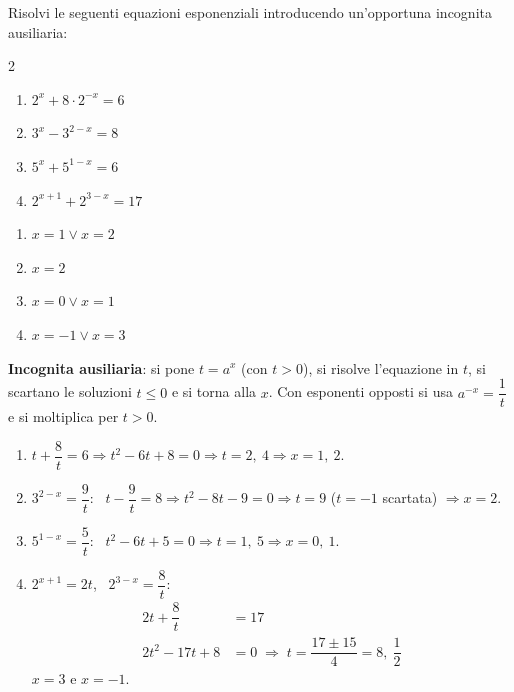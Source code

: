 
\begin{question}[ID=3.9, subtitle={Equazioni con sostituzione: esponenti opposti}, difficulty=media, tags={equazioni, esponenziali, sostituzione}]
Risolvi le seguenti equazioni esponenziali introducendo un'opportuna incognita ausiliaria:
\begin{center}\begin{minipage}{0.92\linewidth}
\begin{multicols}{2}
\begin{enumerate}[leftmargin=3.2cm]
\item $2^{x} + 8 \cdot 2^{-x} = 6$
\item $3^{x} - 3^{2-x} = 8$
\item $5^{x} + 5^{1-x} = 6$
\item $2^{x+1} + 2^{3-x} = 17$
\end{enumerate}
\end{multicols}
\end{minipage}\end{center}
\begin{solution}
\begin{enumerate}
    \item $x=1\vee x=2$
    \item $x=2$
    \item $x=0\vee x=1$
    \item $x=-1\vee x=3$
\end{enumerate}
\end{solution}
\begin{explanation}
\textbf{Incognita ausiliaria}: si pone $t=a^x$ (con $t>0$), si risolve l'equazione in $t$, si scartano le soluzioni $t\leq0$ e si torna alla $x$.
Con esponenti opposti si usa $a^{-x}=\dfrac1t$ e si moltiplica per $t>0$.
\begin{enumerate}
    \item $t+\dfrac8t=6 \Rightarrow t^2-6t+8=0 \Rightarrow t=2,\ 4 \Rightarrow x=1,\ 2$.
    \item $3^{2-x}=\dfrac9t$: \ $t-\dfrac9t=8 \Rightarrow t^2-8t-9=0 \Rightarrow t=9$ ($t=-1$ scartata) $\Rightarrow x=2$.
    \item $5^{1-x}=\dfrac5t$: \ $t^2-6t+5=0 \Rightarrow t=1,\ 5 \Rightarrow x=0,\ 1$.
    \item $2^{x+1}=2t$, \ $2^{3-x}=\dfrac8t$:
    \[\begin{aligned}
    2t+\dfrac8t &= 17\\
    2t^2-17t+8 &= 0 \;\Rightarrow\; t=\dfrac{17\pm15}{4}=8,\ \dfrac12
    \end{aligned}\]
    $x=3$ e $x=-1$.
\end{enumerate}
\end{explanation}
\end{question}

